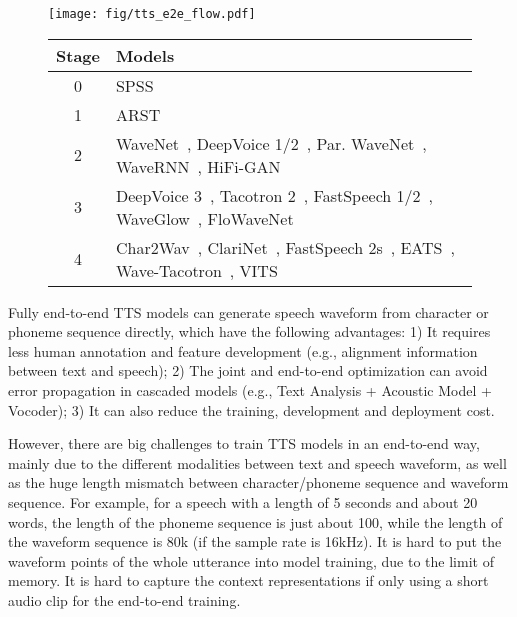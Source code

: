 \documentclass{article}
\begin{document}
\begin{figure} [t!]
\begin{minipage}[b]{1.0\linewidth} 
\centering 
\texttt{[image: fig/tts\_e2e\_flow.pdf]}
\end{minipage} 
\begin{minipage}[b]{1.0\linewidth} 
\centering 
\small
\begin{tabular}{c|l} 
\toprule
Stage &  Models \\
\midrule
0 & SPSS~\cite{yoshimura1999simultaneous,tokuda2000speech,yoshimura2002simultaneous,zen2009statistical,tokuda2013speech} \\
1 & ARST~\cite{wang2016first} \\
2 & WaveNet~\cite{oord2016wavenet}, DeepVoice 1/2~\cite{arik2017deep,gibiansky2017deep}, Par. WaveNet~\cite{oord2018parallel}, WaveRNN~\cite{kalchbrenner2018efficient}, HiFi-GAN~\cite{binkowski2019high}  \\
3 & DeepVoice 3~\cite{ping2018deep}, Tacotron 2~\cite{shen2018natural}, FastSpeech 1/2~\cite{ren2019fastspeech,ren2021fastspeech}, WaveGlow~\cite{prenger2019waveglow}, FloWaveNet~\cite{kim2019flowavenet} \\
4 & Char2Wav~\cite{sotelo2017char2wav}, ClariNet~\cite{ping2018clarinet}, FastSpeech 2s~\cite{ren2021fastspeech}, EATS~\cite{donahue2020end}, Wave-Tacotron~\cite{weiss2020wave}, VITS~\cite{kim2021conditional}  \\
\bottomrule
\end{tabular} 
\label{fig_progress_e2e}
\end{minipage} 
\end{figure}

Fully end-to-end TTS models can generate speech waveform from character or phoneme sequence directly, which have the following advantages: 1) It requires less human annotation and feature development (e.g., alignment information between text and speech); 2) The joint and end-to-end optimization can avoid error propagation in cascaded models (e.g., Text Analysis + Acoustic Model + Vocoder); 3) It can also reduce the training, development and deployment cost. 

However, there are big challenges to train TTS models in an end-to-end way, mainly due to the different modalities between text and speech waveform, as well as the huge length mismatch between character/phoneme sequence and waveform sequence. For example, for a speech with a length of 5 seconds and about 20 words, the length of the phoneme sequence is just about 100, while the length of the waveform sequence is 80k (if the sample rate is 16kHz). It is hard to put the waveform points of the whole utterance into model training, due to the limit of memory. It is hard to capture the context representations if only using a short audio clip for the end-to-end training.
\end{document}
